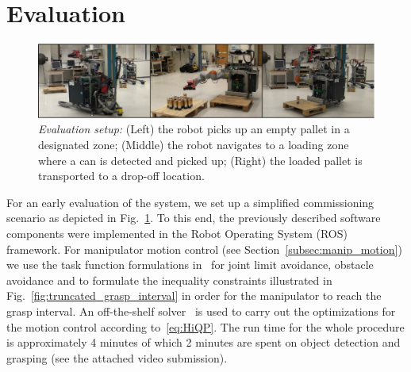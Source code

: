 \section{Evaluation}
\label{sec:eval}
% 
\begin{figure}[t!]
  \begin{center}
    \includegraphics[width =1\linewidth]{figs/evaluation}
    \caption{\textit{Evaluation setup:} (Left) the robot picks up an empty pallet in a designated
      zone; (Middle) the robot navigates to a loading zone where a can is detected and picked up;
      (Right) the loaded pallet is transported to a drop-off location.}
    \label{fig:evaluation}
    \vspace{-0.5cm}
  \end{center}
\end{figure}
% 
For an early evaluation of the system, we set up a simplified commissioning scenario as depicted in
Fig.~\ref{fig:evaluation}. To this end, the previously described software components were
implemented in the Robot Operating System (ROS)~\cite{Quig09} framework. For manipulator motion
control (see Section~\ref{subsec:manip_motion}) we use the task function formulations
in~\cite{Kano09} for joint limit avoidance, obstacle avoidance and to formulate the inequality
constraints illustrated in Fig.~\ref{fig:truncated_grasp_interval} in order for the manipulator to
reach the grasp interval. An off-the-shelf solver~\cite{Guro15} is used to carry out the
optimizations for the motion control according to~\eqref{eq:HiQP}. The run time for the whole
procedure is approximately 4 minutes of which 2 minutes are spent on object detection and grasping
(see the attached video submission).


